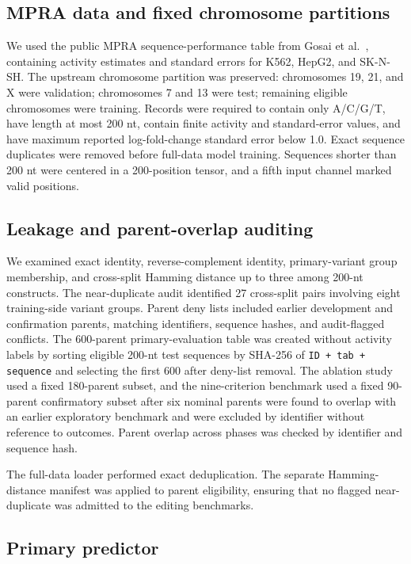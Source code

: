 \subsection{MPRA data and fixed chromosome partitions}

We used the public MPRA sequence-performance table from Gosai et
al.~\citep{Gosai2024}, containing activity estimates and standard errors for K562,
HepG2, and SK-N-SH. The upstream chromosome partition was preserved: chromosomes 19,
21, and X were validation; chromosomes 7 and 13 were test; remaining eligible
chromosomes were training. Records were required to contain only A/C/G/T, have length
at most 200 nt, contain finite activity and standard-error values, and have maximum
reported log-fold-change standard error below 1.0. Exact sequence duplicates were
removed before full-data model training. Sequences shorter than 200 nt were centered
in a 200-position tensor, and a fifth input channel marked valid positions.

\subsection{Leakage and parent-overlap auditing}

We examined exact identity, reverse-complement identity, primary-variant group
membership, and cross-split Hamming distance up to three among 200-nt constructs. The
near-duplicate audit identified 27 cross-split pairs involving eight training-side
variant groups. Parent deny lists included earlier development and confirmation
parents, matching identifiers, sequence hashes, and audit-flagged conflicts. The
600-parent primary-evaluation table was created without activity labels by sorting
eligible 200-nt test sequences by SHA-256 of \texttt{ID + tab + sequence} and
selecting the first 600 after deny-list removal. The ablation study used a fixed
180-parent subset, and the nine-criterion benchmark used a fixed 90-parent confirmatory
subset after six nominal parents were found to overlap with an earlier exploratory
benchmark and were excluded by identifier without reference to outcomes.
Parent overlap across phases was checked by identifier and sequence hash.

The full-data loader performed exact deduplication. The separate Hamming-distance
manifest was applied to parent eligibility, ensuring that no flagged near-duplicate
was admitted to the editing benchmarks.

\subsection{Primary predictor}

